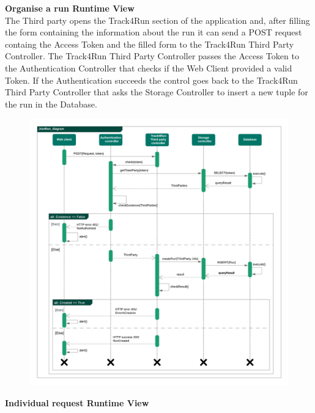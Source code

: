\begin{legal}
\begin{legal}
				\newpage
				\item \textbf{Organise a run Runtime View}\\
The Third party opens the Track4Run section of the application and, after filling the form containing the information about the run it can send a POST request containg the Access Token and the filled form to the Track4Run Third Party Controller.
The Track4Run Third Party Controller passes the Access Token to the Authentication Controller that checks if the Web Client provided a valid Token.
If the Authentication succeeds the control goes back to the Track4Run Third Party Controller that asks the Storage Controller to insert a new tuple for the run in the Database.
				\begin{figure}[H]
				\includegraphics[width=\linewidth]{images/seq_diagrams/seq_OrganizeRun.png}\\
				\end{figure}
				
				\newpage
				\item \textbf{Individual request Runtime View}\\
				

\end{legal}
\end{legal}
